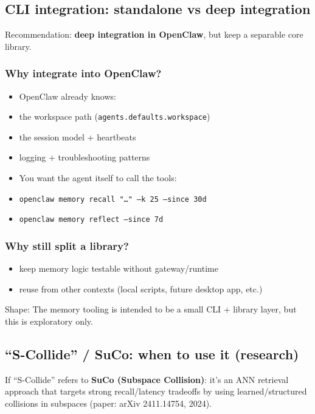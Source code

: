 \subsection{CLI integration: standalone vs deep integration}


Recommendation: \textbf{deep integration in OpenClaw}, but keep a separable core library.

\subsubsection{Why integrate into OpenClaw?}


\begin{itemize}
  \item OpenClaw already knows:
  \item the workspace path (\texttt{agents.defaults.workspace})
  \item the session model + heartbeats
  \item logging + troubleshooting patterns
  \item You want the agent itself to call the tools:
  \item \texttt{openclaw memory recall "…" --k 25 --since 30d}
  \item \texttt{openclaw memory reflect --since 7d}
\end{itemize}


\subsubsection{Why still split a library?}


\begin{itemize}
  \item keep memory logic testable without gateway/runtime
  \item reuse from other contexts (local scripts, future desktop app, etc.)
\end{itemize}


Shape:
The memory tooling is intended to be a small CLI + library layer, but this is exploratory only.

\subsection{“S-Collide” / SuCo: when to use it (research)}


If “S-Collide” refers to \textbf{SuCo (Subspace Collision)}: it’s an ANN retrieval approach that targets strong recall/latency tradeoffs by using learned/structured collisions in subspaces (paper: arXiv 2411.14754, 2024).

